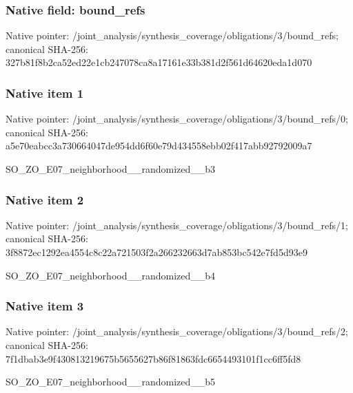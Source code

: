 \documentclass[10pt,a4paper]{article}
\begin{document}
\subsubsection{Native field: bound\_\allowbreak{}refs}
Native pointer: /joint\_\allowbreak{}analysis/synthesis\_\allowbreak{}coverage/obligations/3/bound\_\allowbreak{}refs; canonical SHA-256: 327b81f8b2ca52ed22e1cb247078ca8a17161e33b381d2f561d64620eda1d070

\subsubsection{Native item 1}
Native pointer: /joint\_\allowbreak{}analysis/synthesis\_\allowbreak{}coverage/obligations/3/bound\_\allowbreak{}refs/0; canonical SHA-256: a5e70eabcc3a730664047de954dd6f60e79d434558ebb02f417abb92792009a7

\begingroup\raggedright\sloppy SO\_\allowbreak{}ZO\_\allowbreak{}E07\_\allowbreak{}neighborhood\_\allowbreak{}\_\allowbreak{}randomized\_\allowbreak{}\_\allowbreak{}b3\par\endgroup

\subsubsection{Native item 2}
Native pointer: /joint\_\allowbreak{}analysis/synthesis\_\allowbreak{}coverage/obligations/3/bound\_\allowbreak{}refs/1; canonical SHA-256: 3f8872ec1292ea4554c8c22a721503f2a266232663d7ab853bc542e7fd5d93e9

\begingroup\raggedright\sloppy SO\_\allowbreak{}ZO\_\allowbreak{}E07\_\allowbreak{}neighborhood\_\allowbreak{}\_\allowbreak{}randomized\_\allowbreak{}\_\allowbreak{}b4\par\endgroup

\subsubsection{Native item 3}
Native pointer: /joint\_\allowbreak{}analysis/synthesis\_\allowbreak{}coverage/obligations/3/bound\_\allowbreak{}refs/2; canonical SHA-256: 7f1dbab3e9f430813219675b5655627b86f81863fdc6654493101f1cc6ff5fd8

\begingroup\raggedright\sloppy SO\_\allowbreak{}ZO\_\allowbreak{}E07\_\allowbreak{}neighborhood\_\allowbreak{}\_\allowbreak{}randomized\_\allowbreak{}\_\allowbreak{}b5\par\endgroup
\end{document}
